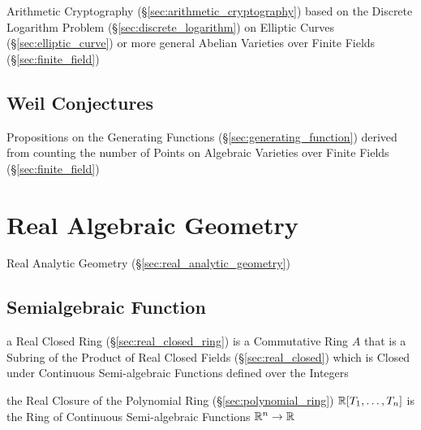\fist Arithmetic Cryptography (\S\ref{sec:arithmetic_cryptography}) based on
the Discrete Logarithm Problem (\S\ref{sec:discrete_logarithm}) on Elliptic
Curves (\S\ref{sec:elliptic_curve}) or more general Abelian Varieties over
Finite Fields (\S\ref{sec:finite_field})



\subsection{Weil Conjectures}\label{sec:weil_conjectures}

Propositions on the Generating Functions (\S\ref{sec:generating_function})
derived from counting the number of Points on Algebraic Varieties over Finite
Fields (\S\ref{sec:finite_field})



\section{Real Algebraic Geometry}\label{sec:real_algebraic_geometry}

Real Analytic Geometry (\S\ref{sec:real_analytic_geometry})



\subsection{Semialgebraic Function}\label{sec:semialgebraic_function}

a Real Closed Ring (\S\ref{sec:real_closed_ring}) is a Commutative Ring $A$
that is a Subring of the Product of Real Closed Fields
(\S\ref{sec:real_closed}) which is Closed under Continuous Semi-algebraic
Functions defined over the Integers

the Real Closure of the Polynomial Ring (\S\ref{sec:polynomial_ring})
$\mathbb{R}[T_1,\ldots,T_n]$ is the Ring of Continuous Semi-algebraic Functions
$\mathbb{R}^n \rightarrow \mathbb{R}$



